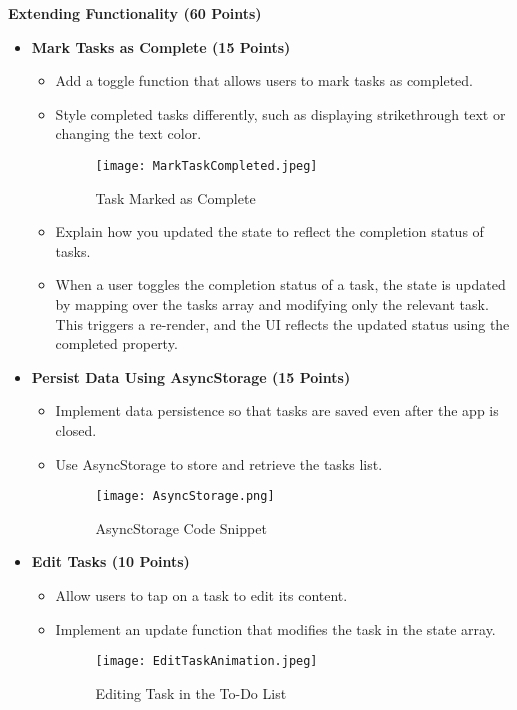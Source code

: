 \documentclass{article}
\begin{document}
\textbf{Extending Functionality (60 Points)}
\begin{itemize}
    \item \textbf{Mark Tasks as Complete (15 Points)}
    \begin{itemize}
        \item Add a toggle function that allows users to mark tasks as completed.
        \item Style completed tasks differently, such as displaying strikethrough text or changing the text color.
        \begin{figure}[H]
            \centering
            \texttt{[image: MarkTaskCompleted.jpeg]}
            \caption{Task Marked as Complete}
        \end{figure}
     
        \item Explain how you updated the state to reflect the completion status of tasks.
        \item When a user toggles the completion status of a task, the state is updated by mapping over the tasks array and modifying only the relevant task. This triggers a re-render, and the UI reflects the updated status using the completed property.
    \end{itemize}
    
    \item \textbf{Persist Data Using AsyncStorage (15 Points)}
    \begin{itemize}
        \item Implement data persistence so that tasks are saved even after the app is closed.
        \item Use AsyncStorage to store and retrieve the tasks list.
        \begin{figure}[H]
            \centering
            \texttt{[image: AsyncStorage.png]}
            \caption{AsyncStorage Code Snippet}
        \end{figure}
    \end{itemize}
    
    \item \textbf{Edit Tasks (10 Points)}
    \begin{itemize}
        \item Allow users to tap on a task to edit its content.
        \item Implement an update function that modifies the task in the state array.
        \begin{figure}[H]
            \centering
            \texttt{[image: EditTaskAnimation.jpeg]}
            \caption{Editing Task in the To-Do List}
        \end{figure}


\end{itemize}
\end{itemize}
\end{document}
